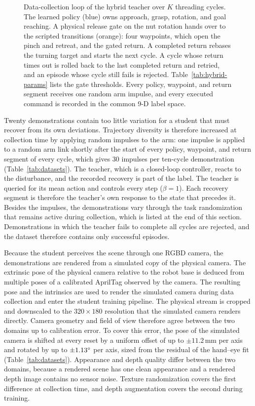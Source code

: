 \begin{figure}[htb]%
    \centering%
    \caption{Data-collection loop of the hybrid teacher over $K$ threading cycles. The learned policy (blue) owns approach, grasp, rotation, and goal reaching. A physical release gate on the nut rotation hands over to the scripted transitions (orange): four waypoints, which open the pinch and retreat, and the gated return. A completed return rebases the turning target and starts the next cycle. A cycle whose return times out is rolled back to the last completed return and retried, and an episode whose cycle still fails is rejected. Table~\ref{tab:hybrid-params} lists the gate thresholds. Every policy, waypoint, and return segment receives one random arm impulse, and every executed command is recorded in the common 9-D label space.}%
    \label{fig:datacollection}%
\end{figure}%

Twenty demonstrations contain too little variation for a student that must recover from its own deviations. Trajectory diversity is therefore increased at collection time by applying random impulses to the arm: one impulse is applied to a random arm link shortly after the start of every policy, waypoint, and return segment of every cycle, which gives 30 impulses per ten-cycle demonstration (Table~\ref{tab:datasets}). The teacher, which is a closed-loop controller, reacts to the disturbance, and the recorded recovery is part of the label. The teacher is queried for its mean action and controls every step ($\beta=1$). Each recovery segment is therefore the teacher's own response to the state that precedes it. Besides the impulses, the demonstrations vary through the task randomization that remains active during collection, which is listed at the end of this section. Demonstrations in which the teacher fails to complete all cycles are rejected, and the dataset therefore contains only successful episodes.

Because the student perceives the scene through one \acs{RGBD} camera, the demonstrations are rendered from a simulated copy of the physical camera. The extrinsic pose of the physical camera relative to the robot base is deduced from multiple poses of a calibrated AprilTag observed by the camera. The resulting pose and the intrinsics are used to render the simulated camera during data collection and enter the student training pipeline. The physical stream is cropped and downscaled to the $320\times180$ resolution that the simulated camera renders directly. Camera geometry and field of view therefore agree between the two domains up to calibration error. To cover this error, the pose of the simulated camera is shifted at every reset by a uniform offset of up to $\pm11.2$\,mm per axis and rotated by up to $\pm1.13^\circ$ per axis, sized from the residual of the hand--eye fit (Table~\ref{tab:datasets}). Appearance and depth quality differ between the two domains, because a rendered scene has one clean appearance and a rendered depth image contains no sensor noise. Texture randomization covers the first difference at collection time, and depth augmentation covers the second during training.

